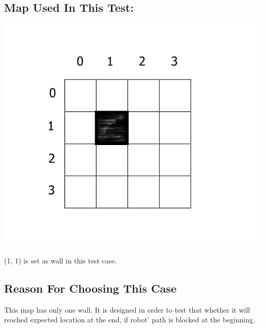 \documentclass[11pt, a4paper]{report}
\begin{document}
\subsection{Map Used In This Test:}
\begin{center}
\includegraphics[scale=0.4]{./image/Test2.png}
\end{center}

\noindent (1, 1) is set as wall in this test case.

\subsection{Reason For Choosing This Case}
This map has only one wall. It is designed in order to test that whether it will reached expected location at the end, if robot' path is blocked at the beginning.
\end{document}
